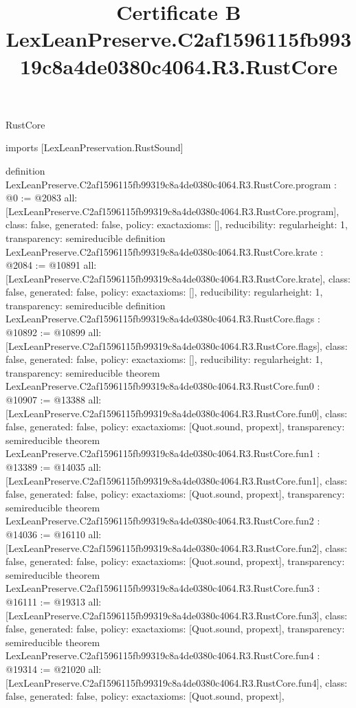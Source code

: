 \begin{lexlean}{RustCore}
\title{Certificate B LexLeanPreserve.C2af1596115fb99319c8a4de0380c4064.R3.RustCore}
\begin{coremodule}
imports [LexLeanPreservation.RustSound]

definition LexLeanPreserve.C2af1596115fb99319c8a4de0380c4064.R3.RustCore.program : @0 := @2083 {
  all: [LexLeanPreserve.C2af1596115fb99319c8a4de0380c4064.R3.RustCore.program],
  class: false,
  generated: false,
  policy: exact{axioms: []},
  reducibility: regular{height: 1},
  transparency: semireducible
}
definition LexLeanPreserve.C2af1596115fb99319c8a4de0380c4064.R3.RustCore.krate : @2084 := @10891 {
  all: [LexLeanPreserve.C2af1596115fb99319c8a4de0380c4064.R3.RustCore.krate],
  class: false,
  generated: false,
  policy: exact{axioms: []},
  reducibility: regular{height: 1},
  transparency: semireducible
}
definition LexLeanPreserve.C2af1596115fb99319c8a4de0380c4064.R3.RustCore.flags : @10892 := @10899 {
  all: [LexLeanPreserve.C2af1596115fb99319c8a4de0380c4064.R3.RustCore.flags],
  class: false,
  generated: false,
  policy: exact{axioms: []},
  reducibility: regular{height: 1},
  transparency: semireducible
}
theorem LexLeanPreserve.C2af1596115fb99319c8a4de0380c4064.R3.RustCore.fun0 : @10907 := @13388 {
  all: [LexLeanPreserve.C2af1596115fb99319c8a4de0380c4064.R3.RustCore.fun0],
  class: false,
  generated: false,
  policy: exact{axioms: [Quot.sound, propext]},
  transparency: semireducible
}
theorem LexLeanPreserve.C2af1596115fb99319c8a4de0380c4064.R3.RustCore.fun1 : @13389 := @14035 {
  all: [LexLeanPreserve.C2af1596115fb99319c8a4de0380c4064.R3.RustCore.fun1],
  class: false,
  generated: false,
  policy: exact{axioms: [Quot.sound, propext]},
  transparency: semireducible
}
theorem LexLeanPreserve.C2af1596115fb99319c8a4de0380c4064.R3.RustCore.fun2 : @14036 := @16110 {
  all: [LexLeanPreserve.C2af1596115fb99319c8a4de0380c4064.R3.RustCore.fun2],
  class: false,
  generated: false,
  policy: exact{axioms: [Quot.sound, propext]},
  transparency: semireducible
}
theorem LexLeanPreserve.C2af1596115fb99319c8a4de0380c4064.R3.RustCore.fun3 : @16111 := @19313 {
  all: [LexLeanPreserve.C2af1596115fb99319c8a4de0380c4064.R3.RustCore.fun3],
  class: false,
  generated: false,
  policy: exact{axioms: [Quot.sound, propext]},
  transparency: semireducible
}
theorem LexLeanPreserve.C2af1596115fb99319c8a4de0380c4064.R3.RustCore.fun4 : @19314 := @21020 {
  all: [LexLeanPreserve.C2af1596115fb99319c8a4de0380c4064.R3.RustCore.fun4],
  class: false,
  generated: false,
  policy: exact{axioms: [Quot.sound, propext]},
}
\end{coremodule}
\end{lexlean}
